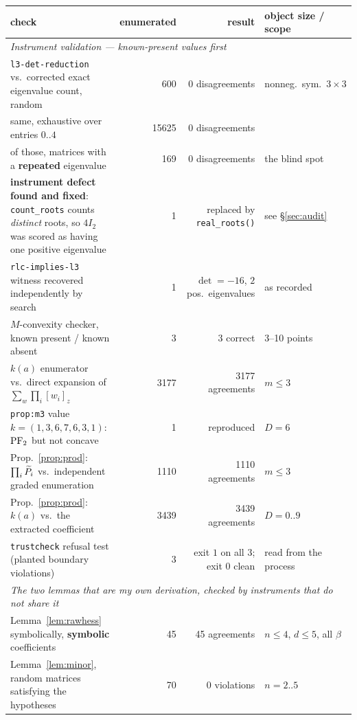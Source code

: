 \begin{table}[t]
\small
\begin{center}
\begin{tabular}{p{}rrp{}}
\hline
check & enumerated & result & object size / scope\\
\hline
\multicolumn{4}{l}{\emph{Instrument validation --- known-present values first}}\\
\texttt{l3-det-reduction} vs.\ corrected exact eigenvalue count, random
  & 600 & 0 disagreements & nonneg.\ sym.\ $3\times3$\\
\quad same, exhaustive over entries $0..4$
  & 15625 & 0 disagreements & \\
\quad of those, matrices with a \textbf{repeated} eigenvalue
  & 169 & 0 disagreements & the blind spot\\
\textbf{instrument defect found and fixed}: \texttt{count\_roots} counts
  \emph{distinct} roots, so $4I_2$ was scored as having one positive eigenvalue
  & 1 & replaced by \texttt{real\_roots()} & see \S\ref{sec:audit}\\
\texttt{rlc-implies-l3} witness recovered independently by search
  & 1 & $\det=-16$, $2$ pos.\ eigenvalues & as recorded\\
$M$-convexity checker, known present / known absent
  & 3 & 3 correct & 3--10 points\\
$k(a)$ enumerator vs.\ direct expansion of $\sum_w\prod_i[w_i]_z$
  & 3177 & 3177 agreements & $m\le3$\\
\texttt{prop:m3} value $k=(1,3,6,7,6,3,1)$: $\mathrm{PF}_2$ but not concave
  & 1 & reproduced & $D=6$\\
Prop.~\ref{prop:prod}: $\prod_i\widetilde P_i$ vs.\ independent graded enumeration
  & 1110 & 1110 agreements & $m\le3$\\
Prop.~\ref{prop:prod}: $k(a)$ vs.\ the extracted coefficient
  & 3439 & 3439 agreements & $D=0..9$\\
\texttt{trustcheck} refusal test (planted boundary violations)
  & 3 & exit $1$ on all $3$; exit $0$ clean & read from the process\\
\hline
\multicolumn{4}{l}{\emph{The two lemmas that are my own derivation, checked by instruments that do not share it}}\\
Lemma~\ref{lem:rawhess} symbolically, \textbf{symbolic} coefficients
  & 45 & 45 agreements & $n\le4$, $d\le5$, all $\beta$\\
Lemma~\ref{lem:minor}, random matrices satisfying the hypotheses
  & 70 & 0 violations & $n=2..5$\\

\end{tabular}
\end{center}
\end{table}
